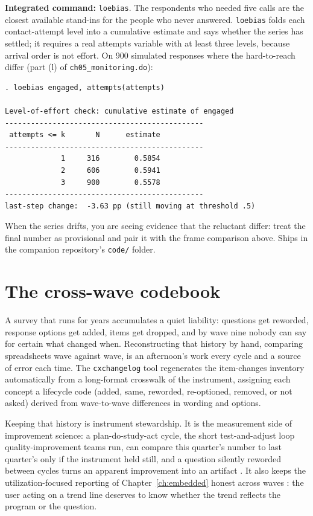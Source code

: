 \documentclass[
    a4paper,
    fontsize=10pt,
    twoside=true,
    numbers=noenddot,
]{kaobook}
\begin{document}
\begin{kaobox}[frametitle=Package Integration: \texttt{loebias}]
\textbf{Integrated command:} \texttt{loebias}. The respondents who needed five calls are the closest available stand-ins for the people who never answered. \texttt{loebias} folds each contact-attempt level into a cumulative estimate and says whether the series has settled; it requires a real attempts variable with at least three levels, because arrival order is not effort. On 900 simulated responses where the hard-to-reach differ (part (l) of \texttt{ch05\_monitoring.do}):
\par
{\footnotesize
\begin{verbatim}
. loebias engaged, attempts(attempts)

Level-of-effort check: cumulative estimate of engaged
----------------------------------------------
 attempts <= k       N      estimate
----------------------------------------------
             1     316        0.5854
             2     606        0.5941
             3     900        0.5578
----------------------------------------------
last-step change:  -3.63 pp (still moving at threshold .5)
\end{verbatim}
}
When the series drifts, you are seeing evidence that the reluctant differ: treat the final number as provisional and pair it with the frame comparison above. Ships in the companion repository's \texttt{code/} folder.
\end{kaobox}

\section{The cross-wave codebook}\label{sec:cxchangelog}
A survey that runs for years accumulates a quiet liability: questions get reworded, response options get added, items get dropped, and by wave nine nobody can say for certain what changed when. Reconstructing that history by hand, comparing spreadsheets wave against wave, is an afternoon's work every cycle and a source of error each time. The \texttt{cxchangelog} tool regenerates the item-changes inventory automatically from a long-format crosswalk of the instrument, assigning each concept a lifecycle code (added, same, reworded, re-optioned, removed, or not asked) derived from wave-to-wave differences in wording and options.

Keeping that history is instrument stewardship. It is the measurement side of improvement science: a plan-do-study-act cycle, the short test-and-adjust loop quality-improvement teams run, can compare this quarter's number to last quarter's only if the instrument held still, and a question silently reworded between cycles turns an apparent improvement into an artifact \parencite{bryk2015improve}. It also keeps the utilization-focused reporting of Chapter~\ref{ch:embedded} honest across waves \parencite{patton2008utilization}: the user acting on a trend line deserves to know whether the trend reflects the program or the question.
\end{document}
